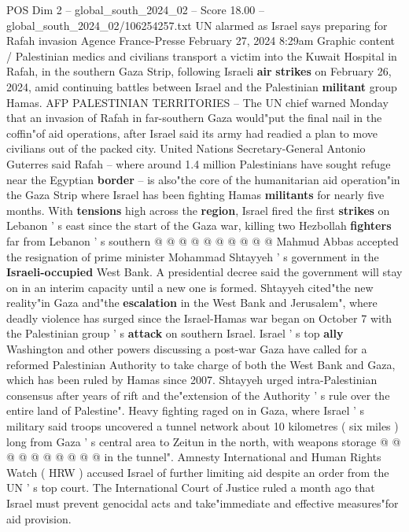 \begin{textsample}{POS Dim 2 – global\_south\_2024\_02 – Score 18.00 – global\_south\_2024\_02/106254257.txt}  \label{ex:f2_pos_197}
UN alarmed as Israel says preparing for Rafah invasion Agence France-Presse February 27, 2024 8:29am Graphic content / Palestinian medics and civilians transport a victim into the Kuwait Hospital in Rafah, in the southern Gaza Strip, following Israeli \textbf{air} \textbf{strikes} on February 26, 2024, amid continuing battles between Israel and the Palestinian \textbf{militant} group Hamas.
AFP PALESTINIAN TERRITORIES -- The UN chief warned Monday that an invasion of Rafah in far-southern Gaza would"put the final nail in the coffin"of aid operations, after Israel said its army had readied a plan to move civilians out of the packed city.
United Nations Secretary-General Antonio Guterres said Rafah -- where around 1.4 million Palestinians have sought refuge near the Egyptian \textbf{border} -- is also"the core of the humanitarian aid operation"in the Gaza Strip where Israel has been fighting Hamas \textbf{militants} for nearly five months.
With \textbf{tensions} high across the \textbf{region}, Israel fired the first \textbf{strikes} on Lebanon ' s east since the start of the Gaza war, killing two Hezbollah \textbf{fighters} far from Lebanon ' s southern @ @ @ @ @ @ @ @ @ @ Mahmud Abbas accepted the resignation of prime minister Mohammad Shtayyeh ' s government in the \textbf{Israeli-occupied} West Bank.
A presidential decree said the government will stay on in an interim capacity until a new one is formed.
Shtayyeh cited"the new reality"in Gaza and"the \textbf{escalation} in the West Bank and Jerusalem", where deadly violence has surged since the Israel-Hamas war began on October 7 with the Palestinian group ' s \textbf{attack} on southern Israel.
Israel ' s top \textbf{ally} Washington and other powers discussing a post-war Gaza have called for a reformed Palestinian Authority to take charge of both the West Bank and Gaza, which has been ruled by Hamas since 2007.
Shtayyeh urged intra-Palestinian consensus after years of rift and the"extension of the Authority ' s rule over the entire land of Palestine".
Heavy fighting raged on in Gaza, where Israel ' s military said troops uncovered a tunnel network about 10 kilometres ( six miles ) long from Gaza ' s central area to Zeitun in the north, with weapons storage @ @ @ @ @ @ @ @ @ @ in the tunnel".
Amnesty International and Human Rights Watch ( HRW ) accused Israel of further limiting aid despite an order from the UN ' s top court.
The International Court of Justice ruled a month ago that Israel must prevent genocidal acts and take"immediate and effective measures"for aid provision.

\end{textsample}
